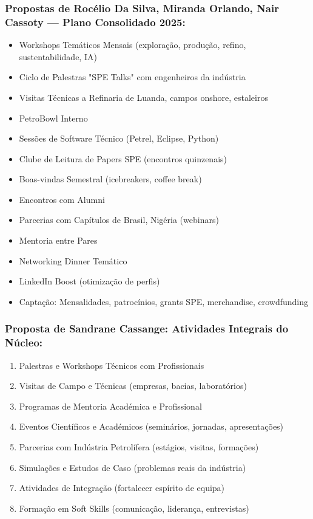 \documentclass[12pt,a4paper]{article}
\begin{document}
\subsubsection*{Propostas de Rocélio Da Silva, Miranda Orlando, Nair Cassoty — Plano Consolidado 2025:}

\begin{itemize}[itemsep=0.15cm]
    \item Workshops Temáticos Mensais (exploração, produção, refino, sustentabilidade, IA)
    \item Ciclo de Palestras "SPE Talks" com engenheiros da indústria
    \item Visitas Técnicas a Refinaria de Luanda, campos onshore, estaleiros
    \item PetroBowl Interno
    \item Sessões de Software Técnico (Petrel, Eclipse, Python)
    \item Clube de Leitura de Papers SPE (encontros quinzenais)
    \item Boas-vindas Semestral (icebreakers, coffee break)
    \item Encontros com Alumni
    \item Parcerias com Capítulos de Brasil, Nigéria (webinars)
    \item Mentoria entre Pares
    \item Networking Dinner Temático
    \item LinkedIn Boost (otimização de perfis)
    \item Captação: Mensalidades, patrocínios, grants SPE, merchandise, crowdfunding
\end{itemize}

\subsubsection*{Proposta de Sandrane Cassange: Atividades Integrais do Núcleo:}

\begin{enumerate}[itemsep=0.1cm]
    \item Palestras e Workshops Técnicos com Profissionais
    \item Visitas de Campo e Técnicas (empresas, bacias, laboratórios)
    \item Programas de Mentoria Académica e Profissional
    \item Eventos Científicos e Académicos (seminários, jornadas, apresentações)
    \item Parcerias com Indústria Petrolífera (estágios, visitas, formações)
    \item Simulações e Estudos de Caso (problemas reais da indústria)
    \item Atividades de Integração (fortalecer espírito de equipa)
    \item Formação em Soft Skills (comunicação, liderança, entrevistas)
\end{enumerate}
\end{document}
